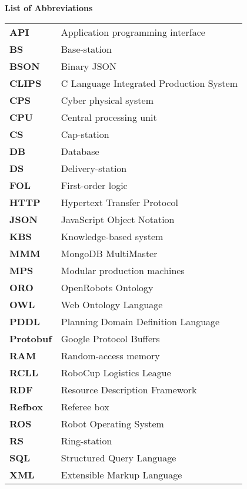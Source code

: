 \newpage

\section*{} 
\vspace{4cm}
\textbf{\noindent \Huge List of Abbreviations}
\vspace{1cm}\\
\begin{tabular}{ll}
\textbf{API} & Application programming interface \\
\textbf{BS} &  Base-station\\
\textbf{BSON} & Binary JSON \\
\textbf{CLIPS} &  C Language Integrated Production System \\
\textbf{CPS} & Cyber physical system \\
\textbf{CPU} & Central processing unit \\
\textbf{CS} &  Cap-station\\
\textbf{DB} & Database \\
\textbf{DS} &  Delivery-station\\
\textbf{FOL} & First-order logic \\
\textbf{HTTP} & Hypertext Transfer Protocol \\
\textbf{JSON} & JavaScript Object Notation \\
\textbf{KBS} & Knowledge-based system \\
\textbf{MMM} & MongoDB MultiMaster \\
\textbf{MPS} &  Modular production machines\\
\textbf{ORO} & OpenRobots Ontology \\
\textbf{OWL} & Web Ontology Language \\
\textbf{PDDL} & Planning Domain Definition Language \\
\textbf{Protobuf} &  Google Protocol Buffers\\
\textbf{RAM} & Random-access memory \\
\textbf{RCLL} & RoboCup Logistics League \\
\textbf{RDF} & Resource Description Framework \\
\textbf{Refbox} &  Referee box\\
\textbf{ROS} &  Robot Operating System\\
\textbf{RS} &  Ring-station\\
\textbf{SQL} & Structured Query Language \\
\textbf{XML} & Extensible Markup Language \\

\end{tabular}

